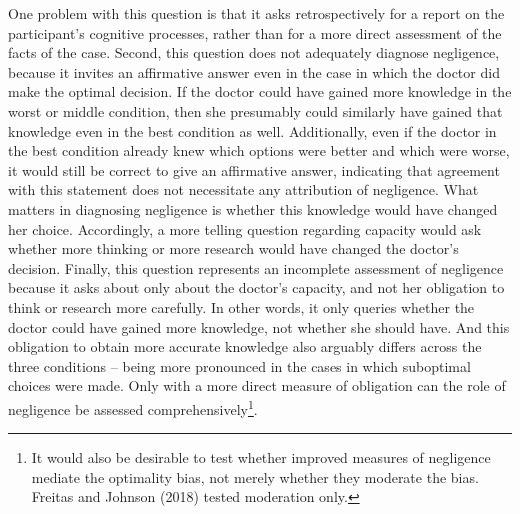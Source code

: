\documentclass[
  man, donotrepeattitle,floatsintext]{apa6}
\begin{document}
One problem with this question is that it asks retrospectively for a report on the participant's cognitive processes, rather than for a more direct assessment of the facts of the case. Second, this question does not adequately diagnose negligence, because it invites an affirmative answer even in the case in which the doctor did make the optimal decision. If the doctor could have gained more knowledge in the worst or middle condition, then she presumably could similarly have gained that knowledge even in the best condition as well. Additionally, even if the doctor in the best condition already knew which options were better and which were worse, it would still be correct to give an affirmative answer, indicating that agreement with this statement does not necessitate any attribution of negligence. What matters in diagnosing negligence is whether this knowledge would have changed her choice. Accordingly, a more telling question regarding capacity would ask whether more thinking or more research would have changed the doctor's decision. Finally, this question represents an incomplete assessment of negligence because it asks about only about the doctor's capacity, and not her obligation to think or research more carefully. In other words, it only queries whether the doctor could have gained more knowledge, not whether she should have. And this obligation to obtain more accurate knowledge also arguably differs across the three conditions -- being more pronounced in the cases in which suboptimal choices were made. Only with a more direct measure of obligation can the role of negligence be assessed comprehensively\footnote{It would also be desirable to test whether improved measures of negligence mediate the optimality bias, not merely whether they moderate the bias. Freitas and Johnson (2018) tested moderation only.}.\\
\end{document}
